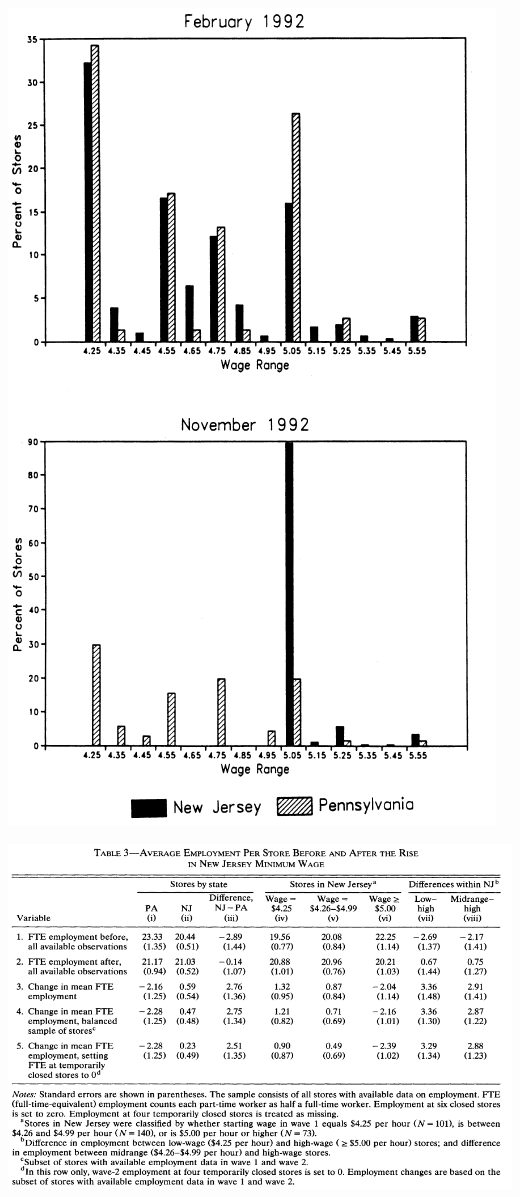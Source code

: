 \begin{frame}
  \vspace{-10pt}
  \includegraphics[height=0.95\textheight]{./resources/CKwages}
\end{frame}
  
\begin{frame}
  \includegraphics[width=\textwidth]{./resources/CKResults}
\end{frame}


